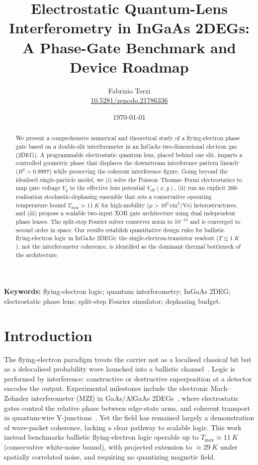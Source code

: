 \documentclass[11pt,a4paper]{article}
\title{\textbf{Electrostatic Quantum-Lens Interferometry in InGaAs 2DEGs:\\
A Phase-Gate Benchmark and Device Roadmap}}
\author{Fabrizio Terzi\\
\small{\href{https://zenodo.org/records/21786336}{10.5281/zenodo.21786336}}}
\date{\today}
\begin{document}
\maketitle

\begin{abstract}
We present a comprehensive numerical and theoretical study of a flying-electron 
phase gate based on a double-slit interferometer in an InGaAs two-dimensional 
electron gas (2DEG). A programmable electrostatic quantum lens, placed behind 
one slit, imparts a controlled geometric phase that displaces the downstream 
interference pattern linearly ($R^2=0.9997$) while preserving the coherent interference figure. 
Going beyond the idealised single-particle model, we (i) solve the Poisson--Thomas--Fermi 
electrostatics to map gate voltage $V_g$ to the effective lens potential 
$V_{\text{eff}}(x,y)$, (ii) run an explicit 200-realisation stochastic-dephasing ensemble that sets a conservative operating temperature bound $T_{\max}\approx\SI{11}{K}$ for high-mobility 
($\mu>10^6\,\text{cm}^2\text{/Vs}$) heterostructures, and (iii) propose a 
scalable two-input XOR gate architecture using dual independent phase lenses. 
The split-step Fourier solver conserves norm to $10^{-13}$ and is converged 
to second order in space. Our results establish quantitative design rules for
ballistic flying-electron logic in InGaAs 2DEGs; the single-electron-transistor
readout ($T\lesssim\SI{1}{K}$), not the interferometer coherence, is identified
as the dominant thermal bottleneck of the architecture.
\end{abstract}

\noindent\textbf{Keywords:} flying-electron logic; quantum interferometry; 
InGaAs 2DEG; electrostatic phase lens; split-step Fourier simulator; 
dephasing budget.

\section{Introduction}
\label{sec:intro}

The flying-electron paradigm treats the carrier not as a localised classical 
bit but as a delocalised probability wave launched into a ballistic 
channel~\cite{bertoni2000,ji2003,bliokh2017}. Logic is performed by 
interference: constructive or destructive superposition at a detector encodes 
the output. Experimental milestones include the electronic Mach--Zehnder 
interferometer (MZI) in GaAs/AlGaAs 2DEGs~\cite{ji2003}, where electrostatic 
gates control the relative phase between edge-state arms, and coherent 
transport in quantum-wire Y-junctions~\cite{bertoni2000}. Yet the field has
remained largely a demonstration of wave-packet coherence, lacking a clear
pathway to scalable logic. This work instead benchmarks ballistic
flying-electron logic operable up to $T_{\max}\approx\SI{11}{K}$
(conservative white-noise bound), with projected extension to
$\approx\SI{29}{K}$ under spatially correlated noise, and requiring no
quantizing magnetic field.
\end{document}
